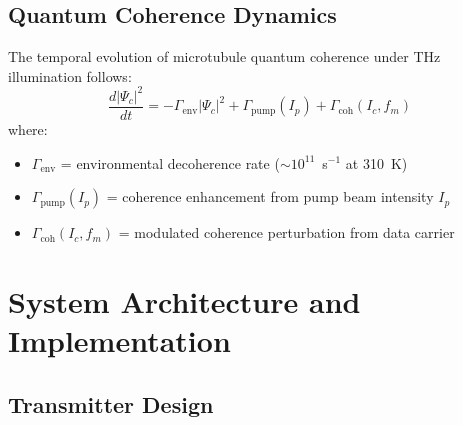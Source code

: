 \subsection{Quantum Coherence Dynamics}

The temporal evolution of microtubule quantum coherence under THz illumination follows:
\begin{equation}
\frac{d|\Psi_c|^2}{dt} = -\Gamma_{\text{env}} |\Psi_c|^2 + \Gamma_{\text{pump}}(I_p) + \Gamma_{\text{coh}}(I_c, f_m)
\end{equation}
where:
\begin{itemize}
\item $\Gamma_{\text{env}}$ = environmental decoherence rate ($\sim 10^{11}$~s$^{-1}$ at 310~K)
\item $\Gamma_{\text{pump}}(I_p)$ = coherence enhancement from pump beam intensity $I_p$
\item $\Gamma_{\text{coh}}(I_c, f_m)$ = modulated coherence perturbation from data carrier
\end{itemize}

\section{System Architecture and Implementation}

\subsection{Transmitter Design}

